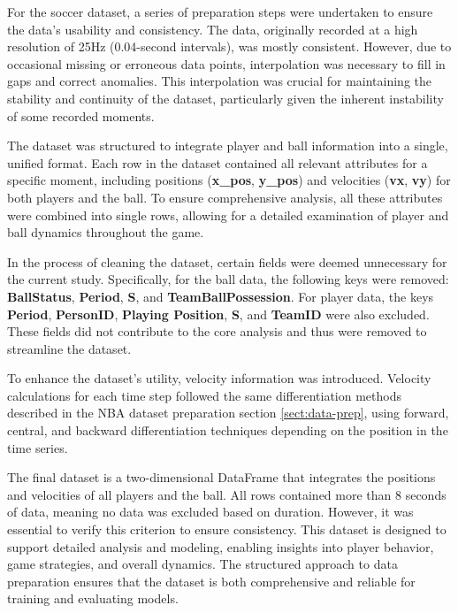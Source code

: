 For the soccer dataset, a series of preparation steps were undertaken to ensure the data's usability and consistency. The data, originally recorded at a high resolution of 25Hz (0.04-second intervals), was mostly consistent. However, due to occasional missing or erroneous data points, interpolation was necessary to fill in gaps and correct anomalies. This interpolation was crucial for maintaining the stability and continuity of the dataset, particularly given the inherent instability of some recorded moments.

The dataset was structured to integrate player and ball information into a single, unified format. Each row in the dataset contained all relevant attributes for a specific moment, including positions (\textbf{x\_pos}, \textbf{y\_pos}) and velocities (\textbf{vx}, \textbf{vy}) for both players and the ball. To ensure comprehensive analysis, all these attributes were combined into single rows, allowing for a detailed examination of player and ball dynamics throughout the game.

In the process of cleaning the dataset, certain fields were deemed unnecessary for the current study. Specifically, for the ball data, the following keys were removed: \textbf{BallStatus}, \textbf{Period}, \textbf{S}, and \textbf{TeamBallPossession}. For player data, the keys \textbf{Period}, \textbf{PersonID}, \textbf{Playing Position}, \textbf{S}, and \textbf{TeamID} were also excluded. These fields did not contribute to the core analysis and thus were removed to streamline the dataset. 

To enhance the dataset's utility, velocity information was introduced. Velocity calculations for each time step followed the same differentiation methods described in the NBA dataset preparation section \ref{sect:data-prep}, using forward, central, and backward differentiation techniques depending on the position in the time series.

The final dataset is a two-dimensional DataFrame that integrates the positions and velocities of all players and the ball. All rows contained more than 8 seconds of data, meaning no data was excluded based on duration. However, it was essential to verify this criterion to ensure consistency. This dataset is designed to support detailed analysis and modeling, enabling insights into player behavior, game strategies, and overall dynamics. The structured approach to data preparation ensures that the dataset is both comprehensive and reliable for training and evaluating models.



